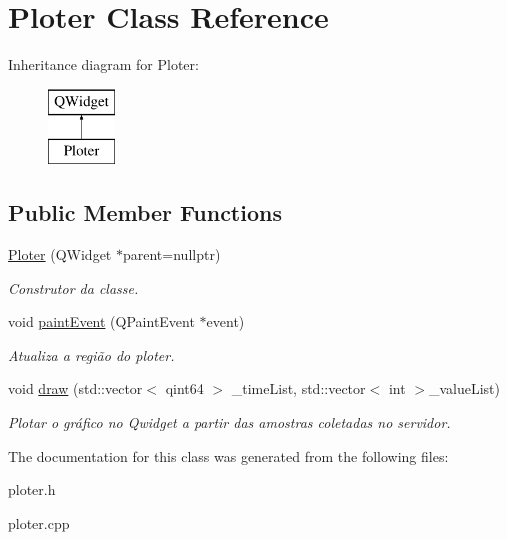 \hypertarget{class_ploter}{}\section{Ploter Class Reference}
\label{class_ploter}
Inheritance diagram for Ploter\+:\begin{figure}[H]
\begin{center}
\leavevmode
\includegraphics[height=2.000000cm]{class_ploter}
\end{center}
\end{figure}
\subsection*{Public Member Functions}
\begin{DoxyCompactItemize}
\item 
\mbox{\label{class_ploter_a1385c16410d893e17c43f28dac9932f6}} 
\mbox{\hyperlink{class_ploter_a1385c16410d893e17c43f28dac9932f6}{Ploter}} (Q\+Widget $\ast$parent=nullptr)
\begin{DoxyCompactList}\small\item\em Construtor da classe. \end{DoxyCompactList}\item 
\mbox{\label{class_ploter_a6a5e47126e28276bb9a8ad65ceea3a08}} 
void \mbox{\hyperlink{class_ploter_a6a5e47126e28276bb9a8ad65ceea3a08}{paint\+Event}} (Q\+Paint\+Event $\ast$event)
\begin{DoxyCompactList}\small\item\em Atualiza a região do ploter. \end{DoxyCompactList}\item 
\mbox{\label{class_ploter_aedc57b2754500bba5aa1facc1e6ec47a}} 
void \mbox{\hyperlink{class_ploter_aedc57b2754500bba5aa1facc1e6ec47a}{draw}} (std\+::vector$<$ qint64 $>$ \+\_\+time\+List, std\+::vector$<$ int $>$\+\_\+value\+List)
\begin{DoxyCompactList}\small\item\em Plotar o gráfico no Qwidget a partir das amostras coletadas no servidor. \end{DoxyCompactList}\end{DoxyCompactItemize}


The documentation for this class was generated from the following files\+:\begin{DoxyCompactItemize}
\item 
ploter.\+h\item 
ploter.\+cpp\end{DoxyCompactItemize}
